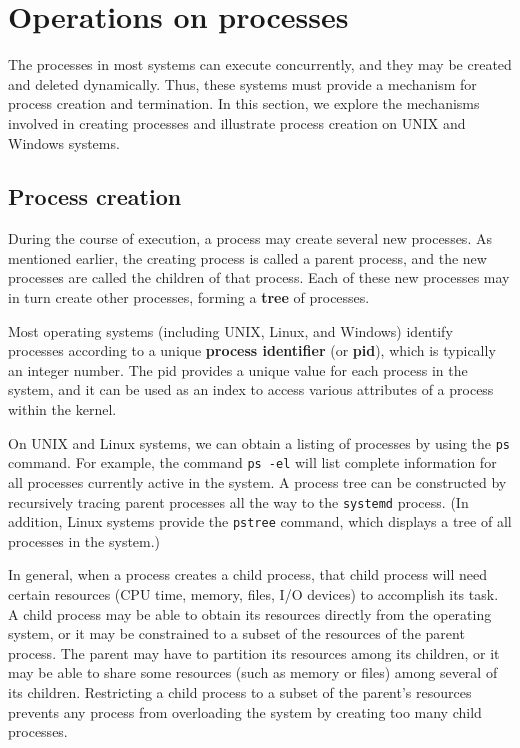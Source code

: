 \section{Operations on processes}\label{sec:3.3}

The processes in most systems can execute concurrently, and they may be created and deleted dynamically. Thus, these systems must provide a mechanism for process creation and termination. In this section, we explore the mechanisms involved in creating processes and illustrate process creation on UNIX and Windows systems.

\subsection*{Process creation}\label{sec:3.3:process_creation}
During the course of execution, a process may create several new processes. As mentioned earlier, the creating process is called a parent process, and the new processes are called the children of that process. Each of these new processes may in turn create other processes, forming a \textbf{tree} of processes.

Most operating systems (including UNIX, Linux, and Windows) identify processes according to a unique \textbf{process identifier} (or \textbf{pid}), which is typically an integer number. The pid provides a unique value for each process in the system, and it can be used as an index to access various attributes of a process within the kernel.

On UNIX and Linux systems, we can obtain a listing of processes by using the \texttt{ps} command. For example, the command \texttt{ps -el} will list complete information for all processes currently active in the system. A process tree can be constructed by recursively tracing parent processes all the way to the \texttt{systemd} process. (In addition, Linux systems provide the \texttt{pstree} command, which displays a tree of all processes in the system.)

In general, when a process creates a child process, that child process will need certain resources (CPU time, memory, files, I/O devices) to accomplish its task. A child process may be able to obtain its resources directly from the operating system, or it may be constrained to a subset of the resources of the parent process. The parent may have to partition its resources among its children, or it may be able to share some resources (such as memory or files) among several of its children. Restricting a child process to a subset of the parent's resources prevents any process from overloading the system by creating too many child processes.

